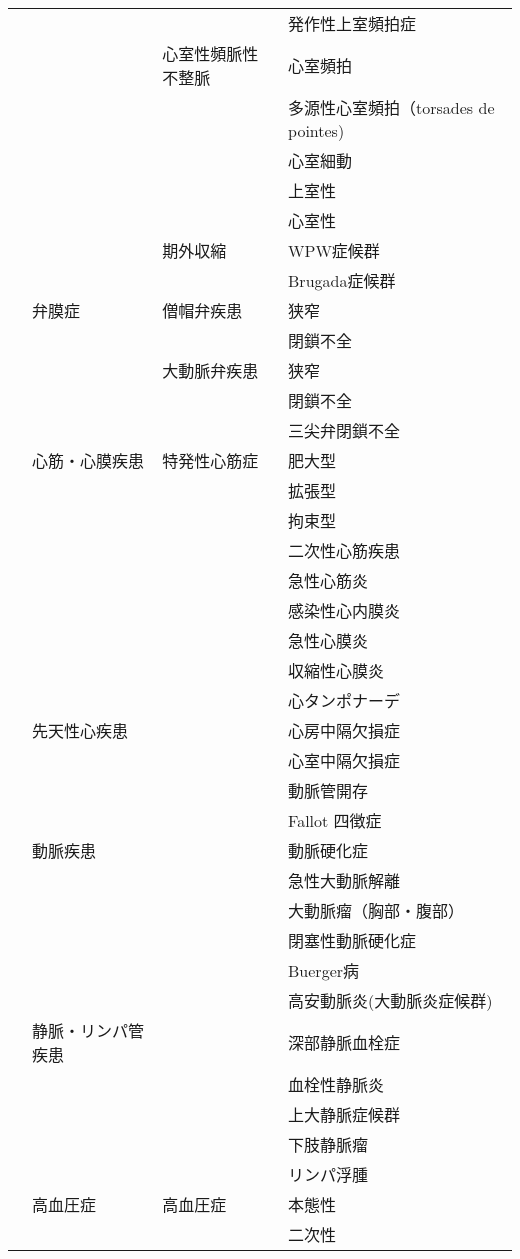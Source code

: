 \begin{xltabular}{\linewidth}{XXXX}
 &  &  & 発作性上室頻拍症 \\
 &  & 心室性頻脈性不整脈 & 心室頻拍 \\
 &  &  & 多源性心室頻拍（torsades de pointes) \\
 &  &  & 心室細動 \\
 &  &  & 上室性 \\
 &  &  & 心室性 \\
 &  & 期外収縮 & WPW症候群 \\
 &  &  & Brugada症候群 \\
 & 弁膜症 & 僧帽弁疾患 & 狭窄 \\
 &  &  & 閉鎖不全 \\
 &  & 大動脈弁疾患 & 狭窄 \\
 &  &  & 閉鎖不全 \\
 &  &  & 三尖弁閉鎖不全 \\
 & 心筋・心膜疾患 & 特発性心筋症 & 肥大型 \\
 &  &  & 拡張型 \\
 &  &  & 拘束型 \\
 &  &  & 二次性心筋疾患 \\
 &  &  & 急性心筋炎 \\
 &  &  & 感染性心内膜炎 \\
 &  &  & 急性心膜炎 \\
 &  &  & 収縮性心膜炎 \\
 &  &  & 心タンポナーデ \\
 & 先天性心疾患 &  & 心房中隔欠損症 \\
 &  &  & 心室中隔欠損症 \\
 &  &  & 動脈管開存 \\
 &  &  & Fallot 四徴症 \\
 & 動脈疾患 &  & 動脈硬化症 \\
 &  &  & 急性大動脈解離 \\
 &  &  & 大動脈瘤（胸部・腹部） \\
 &  &  & 閉塞性動脈硬化症 \\
 &  &  & Buerger病 \\
 &  &  & 高安動脈炎(大動脈炎症候群) \\
 & 静脈・リンパ管疾患 &  & 深部静脈血栓症 \\
 &  &  & 血栓性静脈炎 \\
 &  &  & 上大静脈症候群 \\
 &  &  & 下肢静脈瘤 \\
 &  &  & リンパ浮腫 \\
 & 高血圧症 & 高血圧症 & 本態性 \\
 &  &  & 二次性 \\

\end{xltabular}
